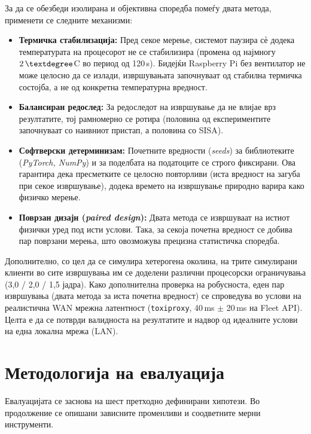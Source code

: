 За да се обезбеди изолирана и објективна споредба помеѓу двата метода, применети се следните механизми:

\begin{itemize}
  \item \textbf{Термичка стабилизација:} Пред секое мерење, системот паузира сѐ додека температурата на процесорот не се стабилизира (промена од најмногу $2\,\textdegree$C во период од 120\,s). Бидејќи Raspberry Pi без вентилатор не може целосно да се излади, извршувањата започнуваат од стабилна термичка состојба, а не од конкретна температурна вредност.
  \item \textbf{Балансиран редослед:} За редоследот на извршување да не влијае врз резултатите, тој рамномерно се ротира (половина од експериментите започнуваат со наивниот пристап, а половина со SISA).
  \item \textbf{Софтверски детерминизам:} Почетните вредности (\emph{seeds}) за библиотеките (\emph{PyTorch, NumPy}) и за поделбата на податоците се строго фиксирани. Ова гарантира дека пресметките се целосно повторливи (иста вредност на загуба при секое извршување), додека времето на извршување природно варира како физичко мерење.
  \item \textbf{Поврзан дизајн (\emph{paired design}):} Двата метода се извршуваат на истиот физички уред под исти услови. Така, за секоја почетна вредност се добива пар поврзани мерења, што овозможува прецизна статистичка споредба.
\end{itemize}

Дополнително, со цел да се симулира хетерогена околина, на трите симулирани клиенти во сите извршувања им се доделени различни процесорски ограничувања (3,0 / 2,0 / 1,5 јадра). Како дополнителна проверка на робусноста, еден пар извршувања (двата метода за иста почетна вредност) се спроведува во услови на реалистична WAN мрежна латентност (\texttt{toxiproxy}, 40\,ms $\pm$ 20\,ms на Fleet API). Целта е да се потврди валидноста на резултатите и надвор од идеалните услови на една локална мрежа (LAN).

\section{Методологија на евалуација}
\label{sec:eval_framework}

Евалуацијата се заснова на шест претходно дефинирани хипотези. Во продолжение се опишани зависните променливи и соодветните мерни инструменти.

